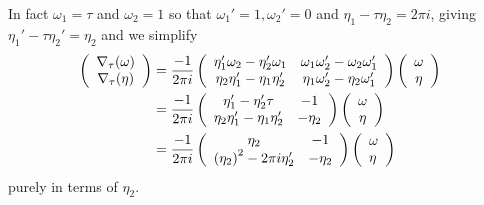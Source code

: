 \begin{frame}
    In fact $\omega_1= \tau$ and $\omega_2 = 1$ so that $\omega_1' = 1, \omega_2' = 0$ and $\eta_1 - \tau \eta_2 = 2 \pi i$, giving $\eta_1' -\tau \eta_2' = \eta_2$ and we simplify 
    \begin{align*}
        \left(\begin{array}{c}
                \nabla_{\tau}(\omega) \\
                \nabla_{\tau}(\eta)
        \end{array}\right)
        &=\frac{-1}{2 \pi i}\left(\begin{array}{cc}
                \eta_{1}^{\prime} \omega_{2}-\eta_{2}^{\prime} \omega_{1} & \omega_{1} \omega_{2}^{\prime}-\omega_{2} \omega_{1}^{\prime} \\
                \eta_{2} \eta_{1}^{\prime}-\eta_{1} \eta_{2}^{\prime} & \eta_{1} \omega_{2}^{\prime}-\eta_{2} \omega_{1}^{\prime}
                \end{array}\right)\left(\begin{array}{c}
                \omega \\
                \eta
        \end{array}\right)\\
        &=\frac{-1}{2 \pi i}\left(\begin{array}{cc}
                \eta_{1}^{\prime}-\eta_{2}^{\prime} \tau & -1 \\
                \eta_{2} \eta_{1}^{\prime}-\eta_{1} \eta_{2}^{\prime} & -\eta_{2}
                \end{array}\right)\left(\begin{array}{c}
                \omega \\
                \eta
        \end{array}\right)\\
        &=\frac{-1}{2 \pi i}\left(\begin{array}{cc}
                \eta_{2} & -1 \\
                \left(\eta_{2}\right)^{2}-2 \pi i \eta_{2}^{\prime} & -\eta_{2}
                \end{array}\right)\left(\begin{array}{l}
                \omega \\
                \eta
        \end{array}\right)
    \end{align*}
    purely in terms of $\eta_2$.
\end{frame}

